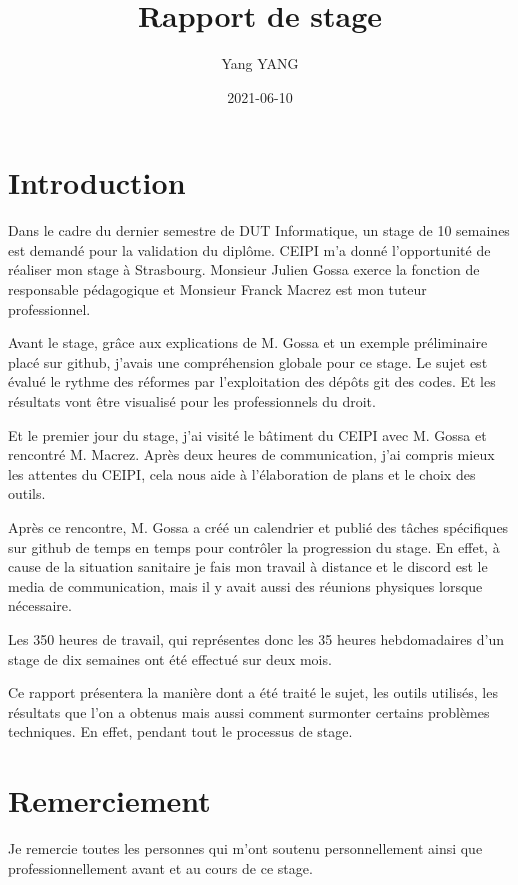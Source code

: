 \documentclass[
  oneside]{book}
\title{Rapport de stage}
\author{Yang YANG}
\date{2021-06-10}
\begin{document}
\maketitle

{
\setcounter{tocdepth}{1}
\tableofcontents
}
\hypertarget{introduction}{%
\chapter{Introduction}\label{introduction}}

Dans le cadre du dernier semestre de DUT Informatique, un stage de 10 semaines est demandé pour la validation du diplôme. CEIPI m'a donné l'opportunité de réaliser mon stage à Strasbourg. Monsieur Julien Gossa exerce la fonction de responsable pédagogique et Monsieur Franck Macrez est mon tuteur professionnel.

Avant le stage, grâce aux explications de M. Gossa et un exemple préliminaire placé sur github, j'avais une compréhension globale pour ce stage. Le sujet est évalué le rythme des réformes par l'exploitation des dépôts git des codes. Et les résultats vont être visualisé pour les professionnels du droit.

Et le premier jour du stage, j'ai visité le bâtiment du CEIPI avec M. Gossa et rencontré M. Macrez. Après deux heures de communication, j'ai compris mieux les attentes du CEIPI, cela nous aide à l'élaboration de plans et le choix des outils.

Après ce rencontre, M. Gossa a créé un calendrier et publié des tâches spécifiques sur github de temps en temps pour contrôler la progression du stage. En effet, à cause de la situation sanitaire je fais mon travail à distance et le discord est le media de communication, mais il y avait aussi des réunions physiques lorsque nécessaire.

Les 350 heures de travail, qui représentes donc les 35 heures hebdomadaires d'un stage de dix semaines ont été effectué sur deux mois.

Ce rapport présentera la manière dont a été traité le sujet, les outils utilisés, les résultats que l'on a obtenus mais aussi comment surmonter certains problèmes techniques. En effet, pendant tout le processus de stage.

\hypertarget{Remerc}{%
\chapter{Remerciement}\label{Remerc}}

Je remercie toutes les personnes qui m'ont soutenu personnellement ainsi que professionnellement avant et au cours de ce stage.
\end{document}
